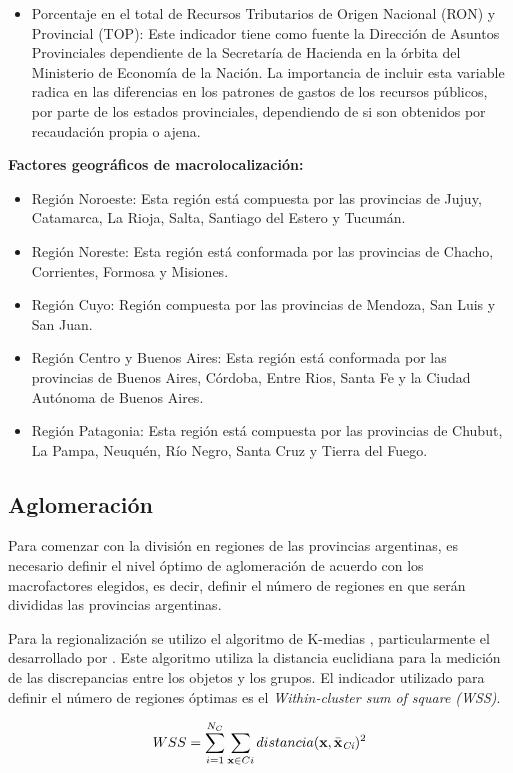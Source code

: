 \documentclass[12pt,a4paper]{article}
\begin{document}
\begin{itemize}
\item Porcentaje en el total de Recursos Tributarios de Origen Nacional (RON) y Provincial (TOP): Este indicador tiene como fuente la Dirección de Asuntos Provinciales dependiente de la Secretaría de Hacienda en la órbita del Ministerio de Economía de la Nación. La importancia de incluir esta variable radica en las diferencias en los patrones de gastos de los recursos públicos, por parte de los estados provinciales, dependiendo de si son obtenidos por recaudación propia o ajena.
\end{itemize}

\textbf{Factores geográficos de macrolocalización:}
\begin{itemize}
\item Región  Noroeste: Esta región está compuesta por las provincias de Jujuy, Catamarca, La Rioja, Salta, Santiago del Estero y Tucumán.
\item Región  Noreste: Esta región está conformada por las provincias de Chacho, Corrientes, Formosa y Misiones.
\item Región Cuyo: Región compuesta por las provincias de Mendoza, San Luis y San Juan.
\item Región Centro y Buenos Aires: Esta región está conformada por las provincias de Buenos Aires, Córdoba, Entre Rios, Santa Fe y la Ciudad Autónoma de Buenos Aires.
\item Región Patagonia: Esta región está compuesta por las provincias de Chubut, La Pampa, Neuquén, Río Negro, Santa Cruz y Tierra del Fuego.
\end{itemize}



\subsection{Aglomeración}

Para comenzar con la división en regiones de las provincias argentinas, es necesario definir el nivel óptimo de aglomeración de acuerdo con los macrofactores elegidos, es decir, definir el número de regiones en que serán divididas las provincias argentinas.

Para la regionalización se utilizo el algoritmo de K-medias \parencite{macqueen_methods_1967}, particularmente el desarrollado por \textcite{hartigan_k-means_1979}. Este algoritmo utiliza la distancia euclidiana para la medición de las discrepancias entre los objetos y los grupos. El indicador utilizado para definir el número de regiones óptimas es el \textit{Within-cluster sum of square (WSS)}.%
\begin {center}
\begin{equation}\label{eq:wss}
WSS=\sum_{i=1}^{N_{C}} \sum_{\textbf{x}\in Ci} distancia(\textbf{x},\bar{\textbf{x}}_{\tiny{\textit{Ci}}})^{2}
\end{equation}
\end {center}
\end{document}
